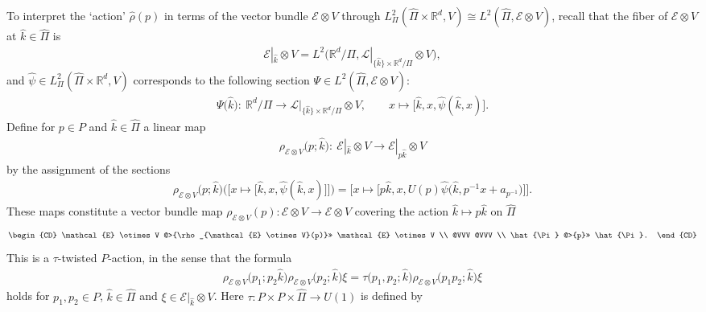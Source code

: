 \documentclass[pdftex]{sigma}
\theoremstyle{definition}
\newcommand{\R}{\mathbb{R}}
\begin{document}
To interpret the `action' $\hat{\rho}(p)$ in terms of the vector bundle $\mathcal{E} \otimes V$ through $L^2_{\Pi}(\hat{\Pi} \times \R^d, V) \cong L^2(\hat{\Pi}, \mathcal{E} \otimes V)$, recall that the f\/iber of $\mathcal{E} \otimes V$ at $\hat{k} \in \hat{\Pi}$ is
\begin{gather*}
\mathcal{E}|_{\hat{k}} \otimes V = L^2\big(\R^d/\Pi, \mathcal{L}|_{\{ \hat{k} \} \times \R^d/\Pi} \otimes V\big),
\end{gather*}
and $\hat{\psi} \in L^2_{\Pi}(\hat{\Pi} \times \R^d, V)$ corresponds to the following section $\Psi \in L^2(\hat{\Pi}, \mathcal{E} \otimes V)$:
\begin{gather*}
\Psi\big(\hat{k}\big) \colon \
\R^d/\Pi \longrightarrow
\mathcal{L}|_{\{ \hat{k} \} \times \R^d/\Pi} \otimes V, \qquad
x \mapsto \big[\hat{k}, x, \hat{\psi}(\hat{k}, x)\big].
\end{gather*}
Def\/ine for $p \in P$ and $\hat{k} \in \hat{\Pi}$ a linear map
\begin{gather*}
\rho_{\mathcal{E} \otimes V}\big(p; \hat{k}\big) \colon \
\mathcal{E}|_{\hat{k}} \otimes V \longrightarrow
\mathcal{E}|_{p\hat{k}} \otimes V
\end{gather*}
by the assignment of the sections
\begin{gather*}
\rho_{\mathcal{E} \otimes V}\big(p; \hat{k}\big)
\big(\big[x \mapsto \big[\hat{k}, x, \hat{\psi}(\hat{k}, x)\big]\big]\big)
= \big[x \mapsto \big[p\hat{k}, x, U(p) \hat{\psi}\big(\hat{k}, p^{-1}x + a_{p^{-1}}\big)\big]\big].
\end{gather*}
These maps constitute a vector bundle map $\rho_{\mathcal{E} \otimes V}(p)\colon \mathcal{E} \otimes V \to \mathcal{E} \otimes V$ covering the action $\hat{k} \mapsto p\hat{k}$ on $\hat{\Pi}$
\begin{gather*}
\begin{CD}
\mathcal{E} \otimes V @>{\rho_{\mathcal{E} \otimes V}(p)}>>
\mathcal{E} \otimes V \\
@VVV @VVV \\
\hat{\Pi} @>{p}>> \hat{\Pi}.
\end{CD}
\end{gather*}
This is a $\tau$-twisted $P$-action, in the sense that the formula
\begin{gather*}
\rho_{\mathcal{E} \otimes V}\big(p_1; p_2\hat{k}\big)
\rho_{\mathcal{E} \otimes V}\big(p_2; \hat{k}\big) \xi
= \tau\big(p_1, p_2; \hat{k}\big) \rho_{\mathcal{E} \otimes V}\big(p_1p_2; \hat{k}\big) \xi
\end{gather*}
holds for $p_1, p_2 \in P$, $\hat{k} \in \hat{\Pi}$ and $\xi \in \mathcal{E}|_{\hat{k}} \otimes V$. Here $\tau \colon P \times P \times \hat{\Pi} \to U(1)$ is def\/ined by
\end{document}
